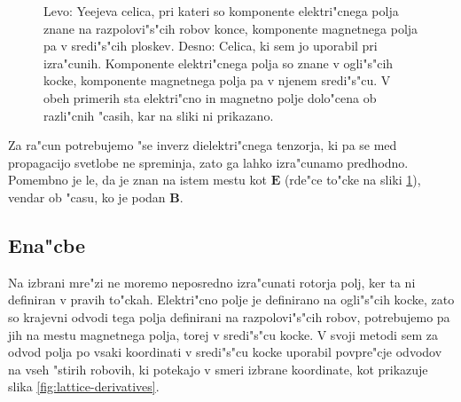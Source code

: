 \documentclass[a4paper,10pt]{article}
\renewcommand{\vec}{\mathbf}
\newcommand{\E}{\vec E}
\newcommand{\B}{\vec B}
\begin{document}
\begin{figure}[h]
\centering
\caption{Levo: Yeejeva celica, pri kateri so komponente elektri"cnega polja znane na razpolovi"s"cih robov konce, komponente magnetnega polja pa v sredi"s"cih ploskev\cite{yee-lattice}. Desno: Celica, ki sem jo uporabil pri izra"cunih. Komponente elektri"cnega polja so znane v ogli"s"cih kocke, komponente magnetnega polja pa v njenem sredi"s"cu. V obeh primerih sta elektri"cno in magnetno polje dolo"cena ob razli"cnih "casih, kar na sliki ni prikazano.}
\label{fig:lattice}
\end{figure}

Za ra"cun potrebujemo "se inverz dielektri"cnega tenzorja, ki pa se med propagacijo svetlobe ne spreminja, zato ga lahko izra"cunamo predhodno. 
Pomembno je le, da je znan na istem mestu kot $\E$ (rde"ce to"cke na sliki \ref{fig:lattice}), vendar ob "casu, ko je podan $\B$. 

\subsection{Ena"cbe}

Na izbrani mre"zi ne moremo neposredno izra"cunati rotorja polj, ker ta ni definiran v pravih to"ckah. 
Elektri"cno polje je definirano na ogli"s"cih kocke, zato so krajevni odvodi tega polja definirani na razpolovi"s"cih robov, potrebujemo pa jih na mestu magnetnega polja, torej v sredi"s"cu kocke. 
V svoji metodi sem za odvod polja po vsaki koordinati v sredi"s"cu kocke uporabil povpre"cje odvodov na vseh "stirih robovih, ki potekajo v smeri izbrane koordinate, kot prikazuje slika \ref{fig:lattice-derivatives}. 
\end{document}
